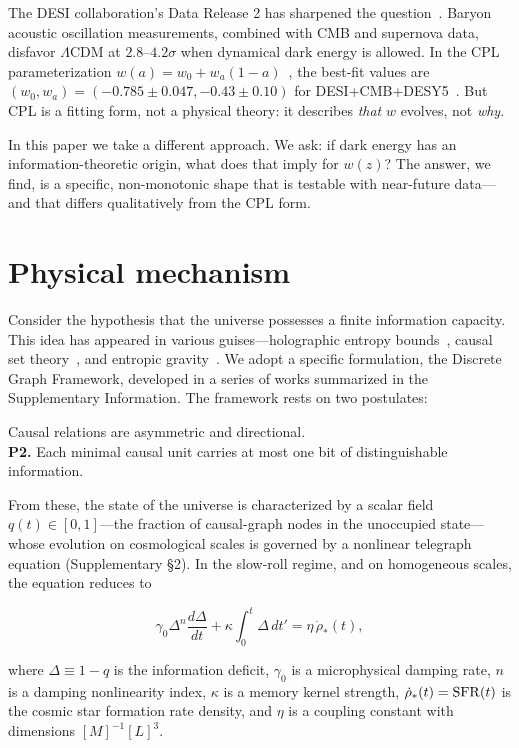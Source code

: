 \documentclass[12pt,a4paper]{article}
\begin{document}
The DESI collaboration's Data Release 2 has sharpened the question~\cite{desi2025}. Baryon acoustic oscillation measurements, combined with CMB and supernova data, disfavor $\Lambda$CDM at $2.8$--$4.2\sigma$ when dynamical dark energy is allowed. In the CPL parameterization $w(a)=w_0+w_a(1-a)$~\cite{chevallier2001}, the best-fit values are $(w_0,w_a)=(-0.785\pm0.047,-0.43\pm0.10)$ for DESI+CMB+DESY5~\cite{zhang2026}. But CPL is a fitting form, not a physical theory: it describes {\it that} $w$ evolves, not {\it why}.

In this paper we take a different approach. We ask: if dark energy has an information-theoretic origin, what does that imply for $w(z)$? The answer, we find, is a specific, non-monotonic shape that is testable with near-future data---and that differs qualitatively from the CPL form.

\section*{Physical mechanism}

Consider the hypothesis that the universe possesses a finite information capacity. This idea has appeared in various guises---holographic entropy bounds~\cite{thooft1993,susskind1995}, causal set theory~\cite{sorkin2005}, and entropic gravity~\cite{verlinde2011,jacobson1995}. We adopt a specific formulation, the Discrete Graph Framework, developed in a series of works summarized in the Supplementary Information. The framework rests on two postulates:

\vspace{4pt}
 Causal relations are asymmetric and directional.\\
{\bf P2.} Each minimal causal unit carries at most one bit of distinguishable information.

\vspace{4pt}
From these, the state of the universe is characterized by a scalar field $q(t)\in[0,1]$---the fraction of causal-graph nodes in the unoccupied state---whose evolution on cosmological scales is governed by a nonlinear telegraph equation (Supplementary \S2). In the slow-roll regime, and on homogeneous scales, the equation reduces to

\begin{equation}\label{eq:ode}
\gamma_0\Delta^n\frac{d\Delta}{dt} + \kappa\int_0^t\Delta\,dt' = \eta\,\dot{\rho}_*(t),
\end{equation}

where $\Delta\equiv1-q$ is the information deficit, $\gamma_0$ is a microphysical damping rate, $n$ is a damping nonlinearity index, $\kappa$ is a memory kernel strength, $\dot{\rho}_*(t)={\rm SFR}(t)$ is the cosmic star formation rate density, and $\eta$ is a coupling constant with dimensions $[M]^{-1}[L]^{3}$.
\end{document}
